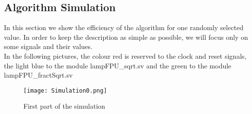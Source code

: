 \subsection{Algorithm Simulation}
In this section we show the efficiency of the algorithm for one randomly selected value. In order to keep the description as simple as possible, we will focus only on some signals and their values.\\ 
In the following pictures, the colour red is reserved to the clock and reset signals, the light blue to the module lampFPU\_sqrt.sv and the green to the module lampFPU\_fractSqrt.sv \\
\begin{figure}[h]
	\centering
	\captionsetup{justification=centering}
	\texttt{[image: Simulation0.png]}	
	\caption{First part of the simulation}
\end{figure}

